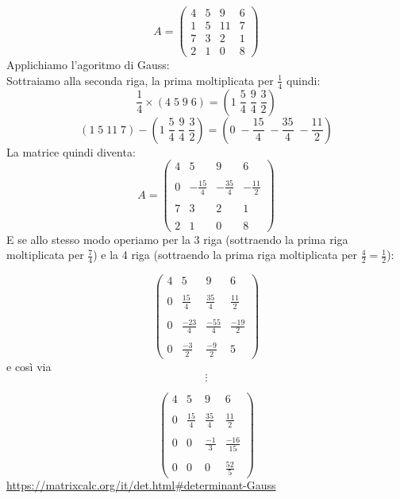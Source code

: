 \documentclass[10pt,a4paper]{article}
\begin{document}
\[A=\begin{pmatrix}
4 & 5 & 9 & 6\\
1 & 5 & 11 & 7\\
7 & 3 & 2 & 1\\
2 & 1 & 0 & 8
\end{pmatrix}\] 	
Applichiamo l'agoritmo di Gauss:\\
Sottraiamo alla seconda riga, la prima moltiplicata per $ \frac{1}{4} $  quindi:\[ \frac{1}{4}\times (4 \; 5 \; 9 \; 6)=(1\;\frac{5}{4}\;\frac{9}{4}\;\frac{3}{2}) \]
\[ (1 \; 5 \; 11 \; 7)-(1\;\frac{5}{4}\;\frac{9}{4}\;\frac{3}{2})=(0\;-\frac{15}{4}\;-\frac{35}{4}\;-\frac{11}{2}) \] La matrice quindi diventa:
\[A=\begin{pmatrix}
4 & 5 & 9 & 6\\\\
0&-\frac{15}{4}&-\frac{35}{4}&-\frac{11}{2}\\\\
7 & 3 & 2 & 1\\\\
2 & 1 & 0 & 8
\end{pmatrix}\]
E se allo stesso modo operiamo per la 3 riga (sottraendo la prima riga moltiplicata per $ \frac{7}{4} $) e la 4 riga (sottraendo la prima riga moltiplicata per $ \frac{4}{2}=\frac{1}{2} $):

\[ \left(\begin{matrix}
4 & 5 & 9 & 6 \\\\
0 & \frac{15}{4} & \frac{35}{4} & \frac{11}{2} \\\\
0 & \frac{-23}{4} & \frac{-55}{4} & \frac{-19}{2} \\\\
0 & \frac{-3}{2} & \frac{-9}{2} & 5
\end{matrix}\right) \]
e così via
\[ \vdots \]

\[ 
\left(\begin{matrix}
	4 & 5 & 9 & 6 \\\\
	0 & \frac{15}{4} & \frac{35}{4} & \frac{11}{2} \\\\
	0 & 0 & \frac{-1}{3} & \frac{-16}{15} \\\\
	0 & 0 & 0 & \frac{52}{5}
\end{matrix}\right)
 \]
\url{ https://matrixcalc.org/it/det.html#determinant-Gauss}
 
\end{document}
